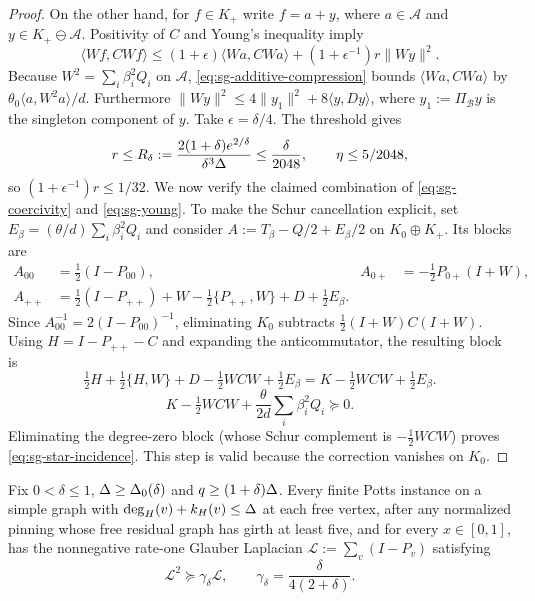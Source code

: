 \begin{proof}
On the other hand, for $f\in K_+$ write $f=a+y$, where
$a\in\mathcal A$ and $y\in K_+\ominus\mathcal A$.
Positivity of $C$ and Young's inequality imply
\begin{equation}\label{eq:sg-young}
 \langle Wf,CWf\rangle
 \le(1+\epsilon)\langle Wa,CWa\rangle
 +(1+\epsilon^{-1})r\|Wy\|^2.
\end{equation}
Because $W^2=\sum_i\beta_i^2Q_i$ on $\mathcal A$,
\eqref{eq:sg-additive-compression} bounds
$\langle Wa,CWa\rangle$ by $\theta_0\langle a,W^2a\rangle/d$.
Furthermore
$\|Wy\|^2\le4\|y_1\|^2+8\langle y,Dy\rangle$, where $y_1:=\Pi_{\mathcal B}y$ is the singleton component of $y$.
Take $\epsilon=\delta/4$.  The threshold gives
\[
 r\le R_\delta:=\frac{2(1+\delta)e^{2/\delta}}{\delta^3\Delta}
 \le\frac{\delta}{2048},\qquad
 \eta\le5/2048,
\]
so $(1+\epsilon^{-1})r\le1/32$.  We now verify the claimed combination
of \eqref{eq:sg-coercivity} and \eqref{eq:sg-young}.
To make the Schur cancellation explicit, set
$E_\beta=(\theta/d)\sum_i\beta_i^2Q_i$ and consider
$A:=T_\beta-Q/2+E_\beta/2$ on $K_0\oplus K_+$.  Its blocks are
\[
 \begin{aligned}
 A_{00}&=\tfrac12(I-P_{00}),
 &A_{0+}&=-\tfrac12P_{0+}(I+W),\\
 A_{++}&=\tfrac12(I-P_{++})+W-\tfrac12\{P_{++},W\}+D+\tfrac12E_\beta .
 \end{aligned}
\]
Since $A_{00}^{-1}=2(I-P_{00})^{-1}$, eliminating $K_0$ subtracts
$\tfrac12(I+W)C(I+W)$.  Using
$H=I-P_{++}-C$ and expanding the anticommutator, the resulting block is
\[
 \tfrac12H+\tfrac12\{H,W\}+D-\tfrac12WCW+\tfrac12E_\beta
 =K-\tfrac12WCW+\tfrac12E_\beta .
\]
\begin{equation}\label{eq:sg-schur-complement}
 K-\tfrac12WCW+\frac{\theta}{2d}\sum_i\beta_i^2Q_i\succeq0.
\end{equation}
Eliminating the degree-zero block (whose Schur complement is
$-\tfrac12WCW$) proves \eqref{eq:sg-star-incidence}.  This step is valid because the correction
vanishes on $K_0$.
\end{proof}

\begin{theorem}
\label{thm:potts-gap-girth5}
Fix $0<\delta\le1$, $\Delta\ge\Delta_0(\delta)$ and
$q\ge(1+\delta)\Delta$.  Every finite Potts instance on a simple graph with
$\deg_H(v)+k_H(v)\le\Delta$ at each free vertex, after any normalized
pinning whose free residual graph has girth at least five, and for every
$x\in[0,1]$, has the nonnegative rate-one Glauber Laplacian
$\mathcal L:=\sum_v(I-P_v)$ satisfying
\begin{equation}\label{eq:sg-gap}
 \mathcal L^2\succeq\gamma_\delta \mathcal L,
 \qquad \gamma_\delta=\frac{\delta}{4(2+\delta)}.
\end{equation}
\end{theorem}

